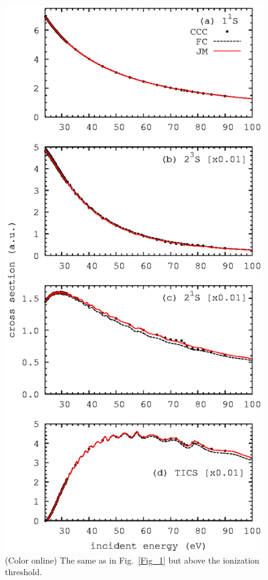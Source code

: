 \documentclass[aip
, pra
, showpacs
, aps
, twocolumn
, groupedaddress
, floatfix
]{revtex4}
\begin{document}
\begin{figure}[htb]
\includegraphics[scale=1]{fig4.ps}
\caption{(Color online)
The same as in Fig.~\ref{Fig_1} but above the ionization threshold. 
}
\label{Fig_4}
\end{figure}
\end{document}
